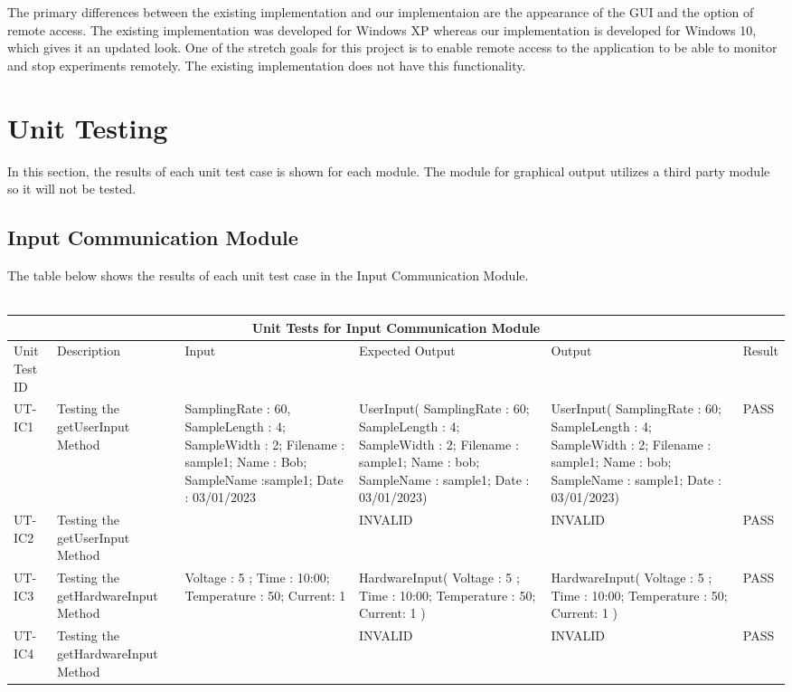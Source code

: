 \documentclass[12pt, titlepage]{article}
\begin{document}
\noindent The primary differences between the existing implementation and our implementaion are the appearance of the GUI and the option of remote access. The existing implementation was developed for Windows XP whereas our implementation is developed for Windows 10, which gives it an updated look. One of the stretch goals for this project is to enable remote access to the application to be able to monitor and stop experiments remotely. The existing implementation does not have this functionality.\\


\section{Unit Testing}
In this section, the results of each unit test case is shown for each module. The module for graphical output utilizes a third party module so it will not be tested.\\

\subsection{Input Communication Module}
The table below shows the results of each unit test case in the Input Communication Module.\\
\\
\begin{tabular}{ |p{1.4cm}||p{2cm}|p{2.5cm}|p{3cm}|p{3cm}|p{1.5cm}|}
  \hline
  \multicolumn{6}{|c|}{Unit Tests for Input Communication Module} \\
  \hline
  Unit Test ID & Description & Input & Expected Output & Output & Result\\
  \hline
  UT-IC1   & Testing the getUserInput Method  &  SamplingRate : 60, SampleLength : 4; SampleWidth : 2; Filename : sample1; Name : Bob; SampleName :sample1; Date : 03/01/2023 & UserInput( SamplingRate : 60; SampleLength : 4; SampleWidth : 2; Filename : sample1; Name : bob; SampleName : sample1; Date : 03/01/2023) & UserInput( SamplingRate : 60; SampleLength : 4; SampleWidth : 2; Filename : sample1; Name : bob; SampleName : sample1; Date : 03/01/2023) & PASS \\
  \hline
  UT-IC2   & Testing the getUserInput Method &   & INVALID & INVALID  & PASS \\
  \hline
  UT-IC3   & Testing the getHardwareInput Method  &  Voltage : 5 ; Time : 10:00; Temperature : 50; Current: 1 & HardwareInput( Voltage : 5 ; Time : 10:00; Temperature : 50; Current: 1 ) & HardwareInput( Voltage : 5 ; Time : 10:00; Temperature : 50; Current: 1 ) & PASS \\
  \hline
  UT-IC4   & Testing the getHardwareInput Method &   & INVALID & INVALID  & PASS \\
  \hline
 \end{tabular}
\end{document}
